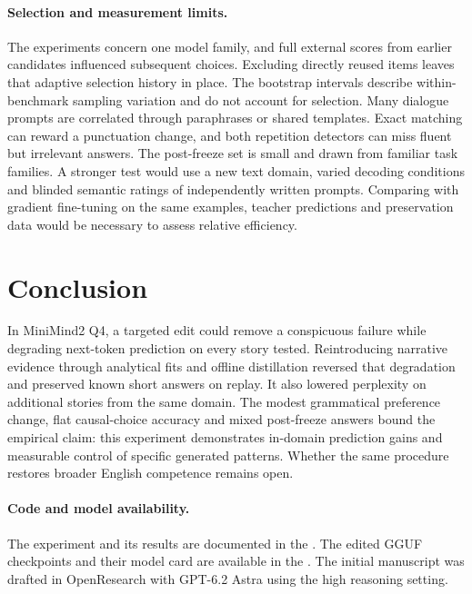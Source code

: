\documentclass[11pt]{article}
\begin{document}
\paragraph{Selection and measurement limits.}
The experiments concern one model family, and full external scores from earlier candidates influenced subsequent choices. Excluding directly reused items leaves that adaptive selection history in place. The bootstrap intervals describe within-benchmark sampling variation and do not account for selection. Many dialogue prompts are correlated through paraphrases or shared templates. Exact matching can reward a punctuation change, and both repetition detectors can miss fluent but irrelevant answers. The post-freeze set is small and drawn from familiar task families. A stronger test would use a new text domain, varied decoding conditions and blinded semantic ratings of independently written prompts. Comparing with gradient fine-tuning on the same examples, teacher predictions and preservation data would be necessary to assess relative efficiency.

\section{Conclusion}
In MiniMind2 Q4, a targeted edit could remove a conspicuous failure while degrading next-token prediction on every story tested. Reintroducing narrative evidence through analytical fits and offline distillation reversed that degradation and preserved known short answers on replay. It also lowered perplexity on additional stories from the same domain. The modest grammatical preference change, flat causal-choice accuracy and mixed post-freeze answers bound the empirical claim: this experiment demonstrates in-domain prediction gains and measurable control of specific generated patterns. Whether the same procedure restores broader English competence remains open.

\paragraph{Code and model availability.}
The experiment and its results are documented in the \projectrepo. The edited GGUF checkpoints and their model card are available in the \modelrepo. The initial manuscript was drafted in OpenResearch with GPT-6.2 Astra using the high reasoning setting.
\end{document}
